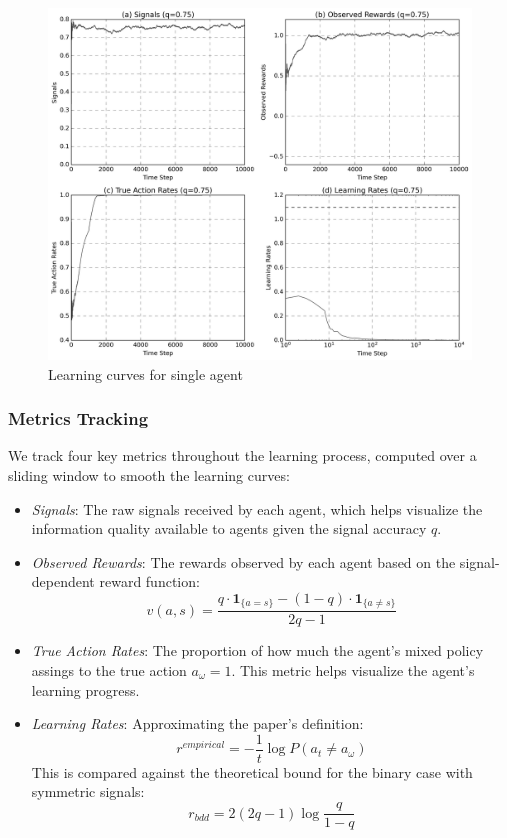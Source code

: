 \begin{figure}[htbp]
    \centering
    \includegraphics[width=1\textwidth]{../charts/single_agent_learning_curves_q=0.75.png}
    \caption{Learning curves for single agent}
    \label{fig:single-learning-curves}
\end{figure}

\subsubsection*{Metrics Tracking}
We track four key metrics throughout the learning process, computed over a sliding window to smooth the learning curves:

\begin{itemize}
    \item \textit{Signals}: The raw signals received by each agent, which helps visualize the information quality available to agents given the signal accuracy $q$.
    
    \item \textit{Observed Rewards}: The rewards observed by each agent based on the signal-dependent reward function:
    \[
        v(a,s) = \frac{q \cdot \mathbf{1}_{\{a = s\}} - (1-q) \cdot \mathbf{1}_{\{a \neq s\}}}{2q-1}
    \]
    
    \item \textit{True Action Rates}: The proportion of how much the agent's mixed policy assings to the true action $a_\omega = 1$. This metric helps visualize the agent's learning progress.
    
    \item \textit{Learning Rates}: Approximating the paper's definition:
    \[
        r^{empirical} =  -\frac{1}{t} \log P(a_t \neq a_\omega)
    \]
    This is compared against the theoretical bound for the binary case with symmetric signals:
    \[
        r_{bdd} = 2(2q-1)\log\frac{q}{1-q}
    \]
\end{itemize}

